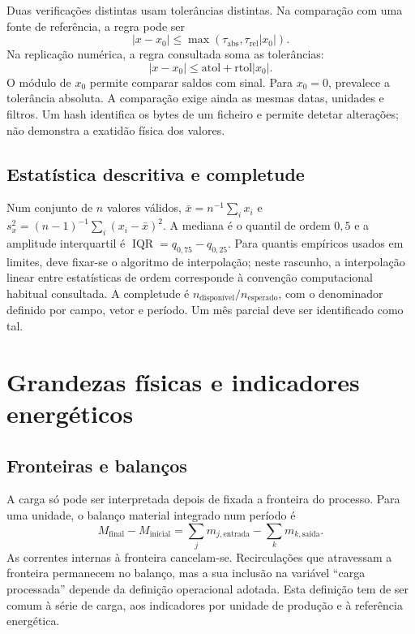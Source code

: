 Duas verificações distintas usam tolerâncias distintas. Na comparação com uma fonte de referência, a regra pode ser
\begin{equation}
|x-x_0|\leq\max(\tau_{\mathrm{abs}},\tau_{\mathrm{rel}}|x_0|).
\label{eq:mat-tolerancia-dados}
\end{equation}
Na replicação numérica, a regra consultada soma as tolerâncias:
\begin{equation}
|x-x_0|\leq\mathrm{atol}+\mathrm{rtol}|x_0|.
\label{eq:mat-tolerancia-replica}
\end{equation}
O módulo de $x_0$ permite comparar saldos com sinal. Para $x_0=0$, prevalece a tolerância absoluta. A comparação exige ainda as mesmas datas, unidades e filtros. Um hash identifica os bytes de um ficheiro e permite detetar alterações; não demonstra a exatidão física dos valores.

\subsection{Estatística descritiva e completude}
\label{sec:mat-descritiva}
Num conjunto de $n$ valores válidos, $\bar x=n^{-1}\sum_i x_i$ e $s_x^2=(n-1)^{-1}\sum_i(x_i-\bar x)^2$. A mediana é o quantil de ordem $0{,}5$ e a amplitude interquartil é $\operatorname{IQR}=q_{0,75}-q_{0,25}$. Para quantis empíricos usados em limites, deve fixar-se o algoritmo de interpolação; neste rascunho, a interpolação linear entre estatísticas de ordem corresponde à convenção computacional habitual consultada. A completude é $n_{\mathrm{disponível}}/n_{\mathrm{esperado}}$, com o denominador definido por campo, vetor e período. Um mês parcial deve ser identificado como tal.


\section{Grandezas físicas e indicadores energéticos}
\label{sec:mat-energia}

\subsection{Fronteiras e balanços}
\label{sec:mat-balancos}
A carga só pode ser interpretada depois de fixada a fronteira do processo. Para uma unidade, o balanço material integrado num período é
\begin{equation}
M_{\mathrm{final}}-M_{\mathrm{inicial}}
=\sum_j m_{j,\mathrm{entrada}}-\sum_k m_{k,\mathrm{saída}}.
\label{eq:mat-balanco-material}
\end{equation}
As correntes internas à fronteira cancelam-se. Recirculações que atravessam a fronteira permanecem no balanço, mas a sua inclusão na variável ``carga processada'' depende da definição operacional adotada. Esta definição tem de ser comum à série de carga, aos indicadores por unidade de produção e à referência energética.

